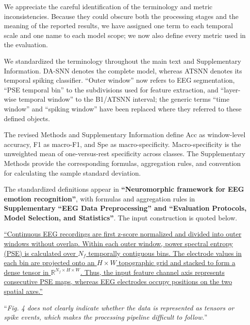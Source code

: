 \documentclass[12pt,technote,onecolumn]{IEEEtran}
\begin{document}

We appreciate the careful identification of the terminology and metric inconsistencies. Because they could obscure both the processing stages and the meaning of the reported results, we have assigned one term to each temporal scale and one name to each model scope; we now also define every metric used in the evaluation.

We standardized the terminology throughout the main text and
Supplementary Information. DA-SNN denotes the complete model, whereas
ATSNN denotes its temporal spiking classifier. ``Outer window'' now
refers to EEG segmentation, ``PSE temporal bin'' to the subdivisions
used for feature extraction, and ``layer-wise temporal window'' to the
B1/ATSNN interval; the generic terms ``time window'' and ``spiking
window'' have been replaced where they referred to these defined
objects.

The revised Methods and Supplementary Information define Acc as window-level accuracy, F1 as macro-F1,
and Spe as macro-specificity. Macro-specificity is the unweighted mean
of one-versus-rest specificity across classes. The Supplementary Methods
provide the corresponding formulas, aggregation rules, and
convention for calculating the sample standard deviation.



The standardized definitions appear in \textbf{``Neuromorphic framework for EEG emotion recognition''}, with formulas and aggregation rules in \textbf{Supplementary ``EEG Data Preprocessing'' and ``Evaluation Protocols, Model Selection, and Statistics''}. The input construction is quoted below.

\uline{``Continuous EEG recordings are first z-score normalized and divided into outer windows without overlap. Within each outer window, power spectral entropy (PSE) is calculated over $N_f$ temporally contiguous bins. The electrode values in each bin are projected onto an $H\times W$ topographic grid and stacked to form a dense tensor in $\mathbb{R}^{N_f\times H\times W}$. Thus, the input feature channel axis represents consecutive PSE maps, whereas EEG electrodes occupy positions on the two spatial axes.''}

\vspace{4mm}

``{\it Fig. 4 does not clearly indicate whether the data is represented as
tensors or spike events, which makes the processing pipeline difficult
to follow.}''
\vspace{1mm}
\end{document}
